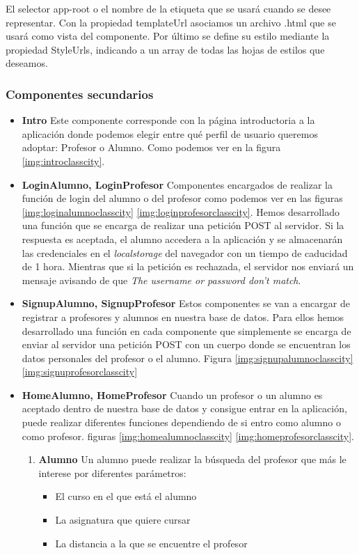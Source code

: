 El selector app-root o el nombre de la etiqueta que se usará cuando se desee representar. Con la propiedad templateUrl asociamos un archivo .html que se usará como vista del componente. Por último se define su estilo mediante la propiedad StyleUrls, indicando a un array de todas las hojas de estilos que deseamos.

\subsubsection{Componentes secundarios }

\begin{itemize}
\item \textbf{Intro} Este componente corresponde con la página introductoria a la aplicación donde podemos elegir entre qué perfil de usuario queremos adoptar: Profesor o Alumno. Como podemos ver en la figura \ref{img:introclasscity}.

\item \textbf{LoginAlumno, LoginProfesor} Componentes encargados de realizar la función de login del alumno o del profesor como podemos ver en las figuras \ref{img:loginalumnoclasscity} \ref{img:loginprofesorclasscity}. Hemos desarrollado una función que se encarga de realizar una petición POST al servidor. Si la respuesta es aceptada, el alumno accedera a la aplicación y se almacenarán las credenciales en el \textit{localstorage} del navegador con un tiempo de caducidad de 1 hora. Mientras que si la petición es rechazada, el servidor nos enviará un mensaje avisando de que \textit{The username or password don't match}.

\item \textbf{SignupAlumno, SignupProfesor} Estos componentes se van a encargar de registrar a profesores y alumnos en nuestra base de datos. Para ellos hemos desarrollado una función en cada componente que simplemente se encarga de enviar al servidor una petición POST con un cuerpo donde se encuentran los datos personales del profesor o el alumno. Figura \ref{img:signupalumnoclasscity} \ref{img:signuprofesorclasscity}

\item \textbf{HomeAlumno, HomeProfesor} Cuando un profesor o un alumno es aceptado dentro de nuestra base de datos y consigue entrar en la aplicación, puede realizar diferentes funciones dependiendo de si entro como alumno o como profesor. figuras \ref{img:homealumnoclasscity} \ref{img:homeprofesorclasscity}.

\begin{enumerate}
\item \textbf{Alumno }  Un alumno puede realizar la búsqueda del profesor que más le interese por diferentes parámetros:
\begin{itemize}
    \item{El curso en el que está el alumno}
    \item{La asignatura que quiere cursar}
    \item{La distancia a la que se encuentre el profesor}
\end{itemize}


\end{enumerate}
\end{itemize}
